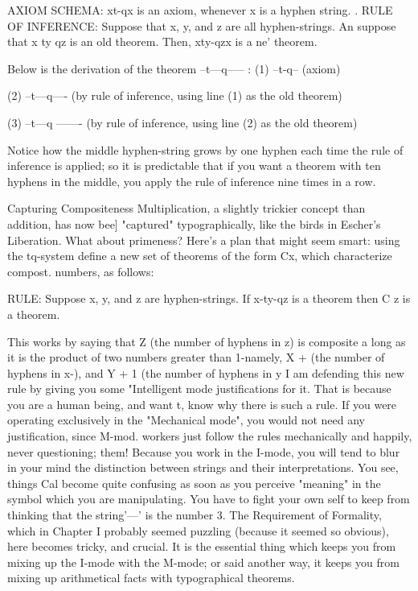 AXIOM SCHEMA: xt-qx is an axiom, whenever x is a hyphen string. . RULE OF INFERENCE: Suppose that x, y, and z are all hyphen-strings. An suppose that x ty qz is an old theorem. Then, xty-qzx is a ne' theorem. 

Below is the derivation of the theorem --t---q----- : 
\intro (1)       --t-q--         (axiom) \endintro

\intro (2)       --t—q----       (by rule of inference, using line (1) as the old theorem) \endintro

\intro (3)       --t---q ------- (by rule of inference, using line (2) as the old theorem) \endintro


Notice how the middle hyphen-string grows by one hyphen each time the rule of inference is applied; so it is predictable that if you want a theorem with ten hyphens in the middle, you apply the rule of inference nine times in a row. 

Capturing Compositeness Multiplication, a slightly trickier concept than addition, has now bee] "captured" typographically, like the birds in Escher's Liberation. What about primeness? Here's a plan that might seem smart: using the tq-system define a new set of theorems of the form Cx, which characterize compost. numbers, as follows: 

RULE: Suppose x, y, and z are hyphen-strings. If x-ty-qz is a theorem then C z is a theorem. 

This works by saying that Z (the number of hyphens in z) is composite a long as it is the product of two numbers greater than 1-namely, X + (the number of hyphens in x-), and Y + 1 (the number of hyphens in y I am defending this new rule by giving you some "Intelligent mode justifications for it. That is because you are a human being, and want t, know why there is such a rule. If you were operating exclusively in the "Mechanical mode", you would not need any justification, since M-mod. workers just follow the rules mechanically and happily, never questioning; them! Because you work in the I-mode, you will tend to blur in your mind the distinction between strings and their interpretations. You see, things Cal become quite confusing as soon as you perceive "meaning" in the symbol which you are manipulating. You have to fight your own self to keep from thinking that the string'---' is the number 3. The Requirement of Formality, which in Chapter I probably seemed puzzling (because it seemed so obvious), here becomes tricky, and crucial. It is the essential thing which keeps you from mixing up the I-mode with the M-mode; or said another way, it keeps you from mixing up arithmetical facts with typographical theorems. 







